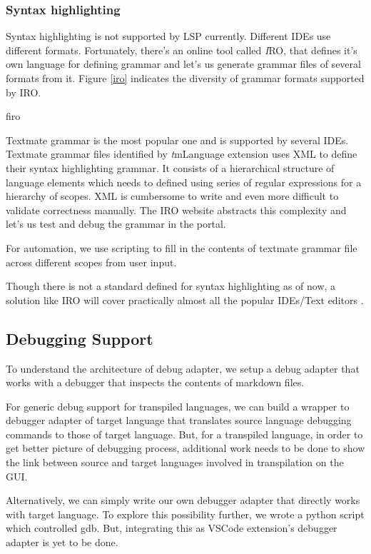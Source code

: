 \documentclass[dvipsnames]{article}
\newcommand{\loadFig}[1]{{%
  \expandafter\let\csname if#1\endcsname\iftrue%
  }
}%
\begin{document}
\subsubsection{Syntax highlighting}
Syntax highlighting is not supported by LSP currently.
Different IDEs use different formats.
Fortunately, there's an online tool called {\textit IRO}\cite{iro}, that defines it's own language for defining grammar and let's us generate grammar files of several formats from it.
Figure \ref{iro} indicates the diversity of grammar formats supported by IRO.

\loadFig{iro}

Textmate grammar is the most popular one and is supported by several IDEs.
Textmate grammar files identified by {\textit tmLanguage} extension uses XML to define their syntax highlighting grammar.
It consists of a hierarchical structure of language elements which needs to defined using series of regular expressions for a hierarchy of scopes.
XML is cumbersome to write and even more difficult to validate correctness manually.
The IRO website abstracts this complexity and let's us test and debug the grammar in the portal.

For automation, we use scripting to fill in the contents of textmate grammar file across different scopes from user input.

Though there is not a standard defined for syntax highlighting as of now, a solution like IRO will cover practically almost all the popular IDEs/Text editors \cite{iroexp}.

\subsection{Debugging Support}

To understand the architecture of debug adapter, we setup a debug adapter\cite{vscdaex} that works with a debugger that inspects the contents of markdown files.

For generic debug support for transpiled languages, we can build a wrapper to debugger adapter of target language that translates source language debugging commands to those of target language.
But, for a transpiled language, in order to get better picture of debugging process, additional work needs to be done to show the link between source and target languages involved in transpilation on the GUI.

Alternatively, we can simply write our own debugger adapter that directly works with target language.
To explore this possibility further, we wrote a python script which controlled gdb.
But, integrating this as VSCode extension's debugger adapter is yet to be done.
\end{document}
